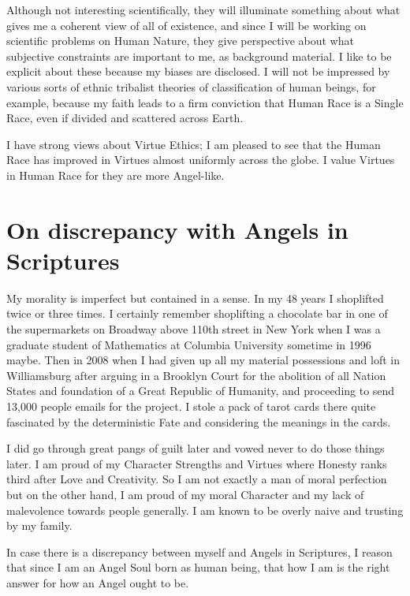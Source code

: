 \documentclass{amsart}
\begin{document}
Although not interesting scientifically, they will illuminate something about what gives me a coherent view of all of existence, and since I will be working on scientific problems on Human Nature, they give perspective about what subjective constraints are important to me, as background material.  I like to be explicit about these because my biases are disclosed.  I will not be impressed by various sorts of ethnic tribalist theories of classification of human beings, for example, because my faith leads to a firm conviction that Human Race is a Single Race, even if divided and scattered across Earth. 

I have strong views about Virtue Ethics; I am pleased to see that the Human Race has improved in Virtues almost uniformly across the globe.  I value Virtues in Human Race for they are more Angel-like.


\section{On discrepancy with Angels in Scriptures}

 My morality is imperfect but contained in a sense.  In my 48 years I shoplifted twice or three times.  I certainly remember shoplifting a chocolate bar in one of the supermarkets on Broadway above 110th street in New York when I was a graduate student of Mathematics at Columbia University sometime in 1996 maybe.  Then in 2008 when I had given up all my material possessions and loft in Williamsburg after arguing in a Brooklyn Court for the abolition of all Nation States and foundation of a Great Republic of Humanity, and proceeding to send 13,000 people emails for the project.  I stole a pack of tarot cards there quite fascinated by the deterministic Fate and considering the meanings in the cards.  

I did go through great pangs of guilt later and vowed never to do those things later.  I am proud of my Character Strengths and Virtues where Honesty ranks third after Love and Creativity.  So I am not exactly a man of moral perfection but on the other hand, I am proud of my moral Character and my lack of malevolence towards people generally.  I am known to be overly naive and trusting by my family.  

In case there is a discrepancy between myself and Angels in Scriptures, I reason that since I am an Angel Soul born as human being, that how I am is the right answer for how an Angel ought to be.
 
\end{document}
